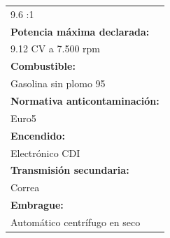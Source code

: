 \begin{table}[H]
\begin{tabular}{l}
9.6 :1                           \\
\textbf{Potencia máxima declarada:}                                              \\
9.12 CV a 7.500 rpm              \\
\textbf{Combustible:}            \\
Gasolina sin plomo 95            \\
\textbf{Normativa anticontaminación:}                                            \\
Euro5                            \\
\textbf{Encendido:}              \\
Electrónico CDI                  \\
\textbf{Transmisión secundaria:} \\
Correa                           \\
\textbf{Embrague:}               \\
Automático centrífugo en seco   
\end{tabular}
\end{table}

